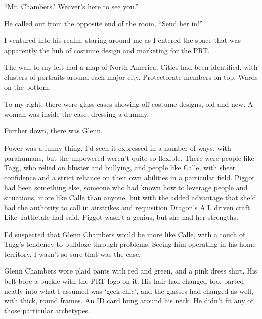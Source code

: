 





``Mr. Chambers?  Weaver's here to see you.''



He called out from the opposite end of the room, ``Send her in!''



I ventured into his realm, staring around me as I entered the space that was apparently the hub of costume design and marketing for the PRT.



The wall to my left had a map of North America.  Cities had been identified, with clusters of portraits around each major city.  Protectorate members on top, Wards on the bottom.



To my right, there were glass cases showing off costume designs, old and new.  A woman was inside the case, dressing a dummy.



Further down, there was Glenn.



Power was a funny thing.  I'd seen it expressed in a number of ways, with parahumans, but the unpowered weren't quite so flexible.  There were people like Tagg, who relied on bluster and bullying, and people like Calle, with sheer confidence and a strict reliance on their own abilities in a particular field.  Piggot had been something else, someone who had known how to leverage people and situations, more like Calle than anyone, but with the added advantage that she'd had the authority to call in airstrikes and requisition Dragon's A.I. driven craft.  Like Tattletale had said, Piggot wasn't a genius, but she had her strengths.



I'd suspected that Glenn Chambers would be more like Calle, with a touch of Tagg's tendency to bulldoze through problems.  Seeing him operating in his home territory, I wasn't so sure that was the case.



Glenn Chambers wore plaid pants with red and green, and a pink dress shirt, His belt bore a buckle with the PRT logo on it.  His hair had changed too, parted neatly into what I assumed was `geek chic', and the glasses had changed as well, with thick, round frames.  An ID card hung around his neck.  He didn't fit any of those particular archetypes.



